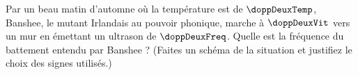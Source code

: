 Par un beau matin d’automne où la température est de $\doppDeuxTemp$, Banshee, le mutant Irlandais au pouvoir phonique, marche à $\doppDeuxVit$ vers un mur en émettant un ultrason de $\doppDeuxFreq$. Quelle est la fréquence du battement entendu par Banshee ? (Faites un schéma de la situation et justifiez le choix des signes utilisés.)